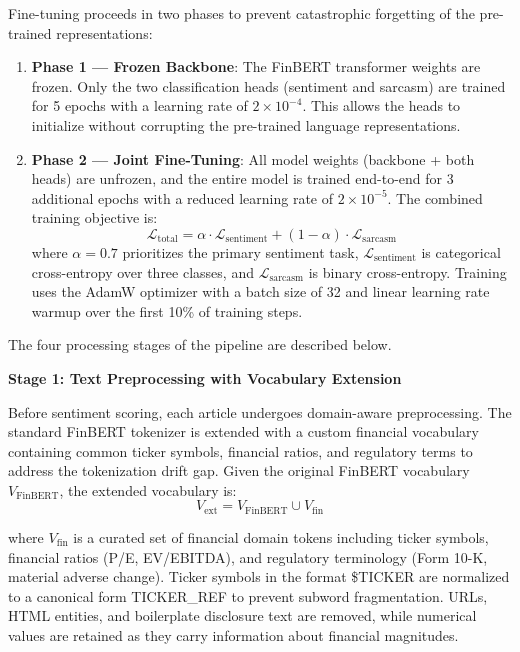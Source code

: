 Fine-tuning proceeds in two phases to prevent catastrophic forgetting of the pre-trained representations:
\begin{enumerate}
    \item \textbf{Phase 1 --- Frozen Backbone}: The FinBERT transformer weights are frozen. Only the two classification heads (sentiment and sarcasm) are trained for 5 epochs with a learning rate of $2 \times 10^{-4}$. This allows the heads to initialize without corrupting the pre-trained language representations.
    \item \textbf{Phase 2 --- Joint Fine-Tuning}: All model weights (backbone + both heads) are unfrozen, and the entire model is trained end-to-end for 3 additional epochs with a reduced learning rate of $2 \times 10^{-5}$. The combined training objective is:
    \begin{equation}
    \mathcal{L}_{\text{total}} = \alpha \cdot \mathcal{L}_{\text{sentiment}} + (1 - \alpha) \cdot \mathcal{L}_{\text{sarcasm}}
    \end{equation}
    where $\alpha = 0.7$ prioritizes the primary sentiment task, $\mathcal{L}_{\text{sentiment}}$ is categorical cross-entropy over three classes, and $\mathcal{L}_{\text{sarcasm}}$ is binary cross-entropy. Training uses the AdamW optimizer with a batch size of 32 and linear learning rate warmup over the first 10\% of training steps.
\end{enumerate}

The four processing stages of the pipeline are described below.

\textbf{Stage 1: Text Preprocessing with Vocabulary Extension}

Before sentiment scoring, each article undergoes domain-aware preprocessing. The standard FinBERT tokenizer is extended with a custom financial vocabulary containing common ticker symbols, financial ratios, and regulatory terms to address the tokenization drift gap. Given the original FinBERT vocabulary $V_{\text{FinBERT}}$, the extended vocabulary is:
\begin{equation}
V_{\text{ext}} = V_{\text{FinBERT}} \cup V_{\text{fin}}
\end{equation}

where $V_{\text{fin}}$ is a curated set of financial domain tokens including ticker symbols, financial ratios (P/E, EV/EBITDA), and regulatory terminology (Form 10-K, material adverse change). Ticker symbols in the format \$TICKER are normalized to a canonical form TICKER\_REF to prevent subword fragmentation. URLs, HTML entities, and boilerplate disclosure text are removed, while numerical values are retained as they carry information about financial magnitudes.

